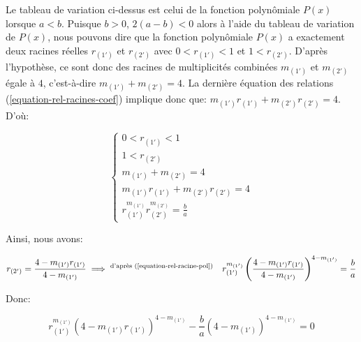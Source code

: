 \documentclass[12pt,a4paper,article]{memoir}
\begin{document}
\bigskip

\begin{center}
\end{center}

\bigskip

Le tableau de variation ci-dessus est celui de la fonction polynômiale $P(x)$ lorsque $a < b$. Puisque $b > 0$, $2(a-b) < 0$ alors à l'aide du tableau de variation de $P(x)$, nous pouvons dire que la fonction polynômiale $P(x)$ a exactement deux racines réelles $r_{(1')}$ et $r_{(2')}$ avec $0 < r_{(1')} < 1$ et $1 < r_{(2')}$. D'après l'hypothèse, ce sont donc des racines de multiplicités combinées $m_{(1')}$ et $m_{(2')}$ égale à $4$, c'est-à-dire $m_{(1')} + m_{(2')} = 4$. La dernière équation des relations (\ref{equation-rel-racines-coef}) implique donc que: $m_{(1')}r_{(1')} + m_{(2')}r_{(2')} =4$. D'où:

\begin{equation}
\left\{
	\begin{array}{l}
	0 < r_{(1')} < 1\\
	1 < r_{(2')}\\
	m_{(1')} + m_{(2')} = 4\\
	m_{(1')}r_{(1')} + m_{(2')}r_{(2')} = 4\\
	r_{(1')}^{m_{(1')}}r_{(2')}^{m_{(2')}} = \frac{b}{a}
	\end{array}
\right.
\label{equation-rel-racine-pol}
\end{equation}

Ainsi, nous avons:

\[r_{(2')} = \frac{4 - m_{(1')}r_{(1')}}{4 - m_{(1')}} \implies^{\textrm{d'après (\ref{equation-rel-racine-pol})}} \quad r_{(1')}^{m_{(1')}}\left(\frac{4 - m_{(1')}r_{(1')}}{4 - m_{(1')}}\right)^{4 - m_{(1')}} = \frac{b}{a}\]

Donc:

\begin{equation}
r_{(1')}^{m_{(1')}}(4 - m_{(1')}r_{(1')})^{4 - m_{(1')}} - \frac{b}{a}(4 - m_{(1')})^{4 - m_{(1')}} = 0
\label{equation-val-fct-rac-posleq1}
\end{equation}
 
\end{document}

